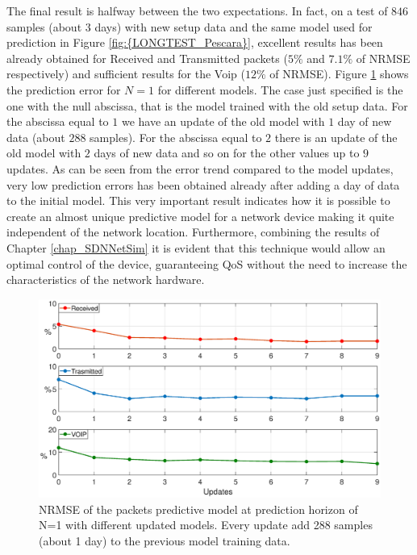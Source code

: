 The final result is halfway between the two expectations. In fact, on a test of $846$ samples (about $3$ days) with new setup data and the same model used for prediction in Figure \ref{fig:{LONGTEST_Pescara}}, excellent results has been already obtained for Received and Transmitted packets ($5\%$ and $7.1\%$ of NRMSE respectively) and sufficient results for the Voip ($12\%$ of NRMSE). Figure \ref{fig:{NEWSETUP_Pescara}} shows the prediction error for $N = 1$ for different models. The case just specified is the one with the null abscissa, that is the model trained with the old setup data. For the abscissa equal to $1$ we have an update of the old model with $1$ day of new data (about $288$ samples). For the abscissa equal to $2$ there is an update of the old model with $2$ days of new data and so on for the other values up to $9$ updates. As can be seen from the error trend compared to the model updates, very low prediction errors has been obtained already after adding a day of data to the initial model. This very important result indicates how it is possible to create an almost unique predictive model for a network device making it quite independent of the network location. Furthermore, combining the results of Chapter \ref{chap_SDNNetSim} it is evident that this technique would allow an optimal control of the device, guaranteeing QoS without the need to increase the characteristics of the network hardware.
\begin{figure}[H]
	\centering
	\includegraphics[trim={120 0 120 0}, width=1\linewidth]{figure/NEWSETUP_PESCARA.eps}
	\caption{NRMSE of the packets predictive model at prediction horizon of N=1 with different updated models. Every update add 288 samples (about 1 day) to the previous model training data.}
	\label{fig:{NEWSETUP_Pescara}}
\end{figure}